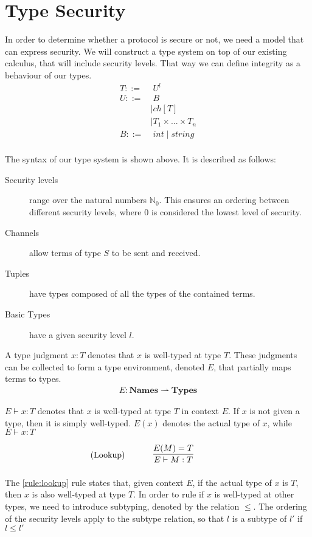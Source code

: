 \section{Type Security}
In order to determine whether a protocol is secure or not, we need a model that can express security.
We will construct a type system on top of our existing calculus, that will include security levels.
That way we can define integrity as a behaviour of our types.
\begin{align*}
	T::=&\;U^l\\
	U::=&\;B \tag{Basic}\\
	&\mid ch[T] \tag{Channel}\\
	&\mid T_1 \times...\times T_n \tag{Tuple}\\
	B::=&\;int 
	\mid string\\
\end{align*}

\noindent The syntax of our type system is shown above. It is described as follows:

\begin{description}
\item[Security levels] range over the natural numbers $\mathbb{N}_0$. This ensures an ordering between different security levels, where $0$ is considered the lowest level of security.
\item[Channels] allow terms of type $S$ to be sent and received.
\item[Tuples] have types composed of all the types of the contained terms.
\item[Basic Types] have a given security level $l$.
\end{description}

\noindent A type judgment $x:T$ denotes that $x$ is well-typed at type $T$.
These judgments can be collected to form a type environment, denoted $E$, that partially maps terms to types.
\begin{align*}
E: \mathbf{Names} \rightharpoonup \mathbf{Types}
\end{align*}

\noindent $E\vdash x:T$ denotes that $x$ is well-typed at type $T$ in context $E$.
If $x$ is not given a type, then it is simply well-typed. $E(x)$ denotes the actual type of $x$, while $E\vdash x:T$ 

\begin{align*}
\tag{Lookup}\label{rule:lookup} &\infrule{E(M)=T}{E\vdash M:T}
\end{align*}

The \ref{rule:lookup} rule states that, given context $E$, if the actual type of $x$ is $T$, then $x$ is also well-typed at type $T$. 
In order to rule if $x$ is well-typed at other types, we need to introduce subtyping, denoted by the relation $\leq$. The ordering of the security levels apply to the subtype relation, so that $l$ is a subtype of $l'$ if $l\leq l'$

